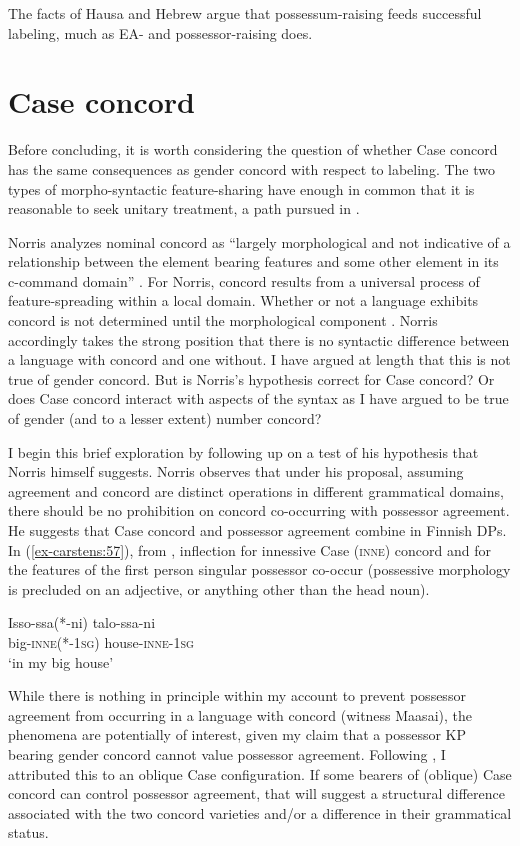 \documentclass[output=paper
,modfonts
,nonflat]{langsci/langscibook}
\begin{document}
\noindent The facts of Hausa and Hebrew argue that possessum-raising feeds successful labeling, much as EA- and possessor-raising does.

\section{Case concord} \label{sec-carstens:7}
Before concluding, it is worth considering the question of whether Case concord has the same consequences as gender concord with respect to labeling. The two types of morpho-syntactic feature-sharing have enough in common that it is reasonable to seek unitary treatment, a path pursued in \citet{Norris2014}. 

Norris analyzes nominal concord as “largely morphological and not indicative of a relationship between the element bearing features and some other element in its c-command domain” \citep[98]{Norris2014}. For Norris, concord results from a universal process of feature-spreading within a local domain. Whether or not a language exhibits concord is not determined until the morphological component \citep[132]{Norris2014}. Norris accordingly takes the strong position that there is no syntactic difference between a language with concord and one without. I have argued at length that this is not true of gender concord. But is Norris's hypothesis correct for Case concord? Or does Case concord interact with aspects of the syntax as I have argued to be true of gender (and to a lesser extent) number concord?

I begin this brief exploration by following up on a test of his hypothesis that Norris himself suggests. Norris observes that under his proposal, assuming agreement and concord are distinct operations in different grammatical domains, there should be no prohibition on concord co-occurring with possessor agreement. He suggests that Case concord and possessor agreement combine in Finnish DPs. In (\ref{ex-carstens:57}), from \citet[163]{Norris2014}, inflection for innessive Case (\textsc{inne}) concord and for the features of the first person singular possessor co-occur (possessive morphology is precluded on an adjective, or anything other than the head noun).

\begin{exe}
\ex \label{ex-carstens:57}
\gll Isso-ssa(*-ni)     talo-ssa-ni\\
big-\textsc{inne}(*-1\textsc{sg}) house-\textsc{inne}{}-1\textsc{sg}\\
\glt `in my big house'
\end{exe}
While there is nothing in principle within my account to prevent possessor agreement from occurring in a language with concord (witness Maasai), the phenomena are potentially of interest, given my claim that a possessor KP bearing gender concord cannot value possessor agreement. Following \citet{Toosarvandani_Van_Urk2014}, I attributed this to an oblique Case configuration. If some bearers of (oblique) Case concord can control possessor agreement, that will suggest a structural difference associated with the two concord varieties and/or a difference in their grammatical status. 
\end{document}
